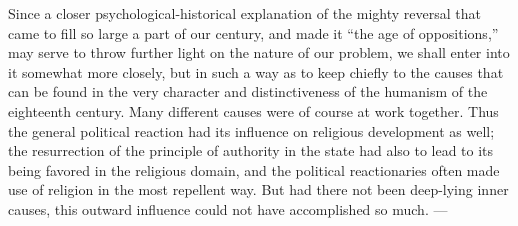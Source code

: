 \documentclass[12pt,a4paper]{article}
\begin{document}
Since a closer psychological-historical explanation of the mighty reversal
that came to fill so large a part of our century, and made it ``the age of
oppositions,'' may serve to throw further light on the nature of our problem,
we shall enter into it somewhat more closely, but in such a way as to keep
chiefly to the causes that can be found in the very character and
distinctiveness of the humanism of the eighteenth century. Many different
causes were of course at work together. Thus the general political reaction
had its influence on religious development as well; the resurrection of the
principle of authority in the state had also to lead to its being favored in
the religious domain, and the political reactionaries often made use of
religion in the most repellent way. But had there not been deep-lying inner
causes, this outward influence could not have accomplished so much. ---
\end{document}
